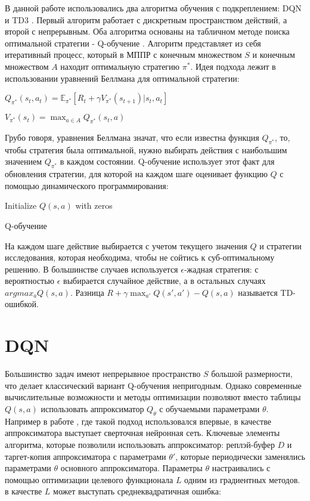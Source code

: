 \documentclass{mipt-thesis-bs}
\begin{document}
В данной работе использовались два алгоритма обучения с подкреплением: DQN \cite{DQN} и TD3 \cite{TD3}. Первый алгоритм работает с дискретным пространством действий, а второй с непрерывным. Оба алгоритма основаны на табличном методе поиска оптимальной стратегии - Q-обучение \cite{Q-обучение}. Алгоритм представляет из себя итеративный процесс, который в МППР с конечным множеством $S$ и конечным множеством $A$ находит оптимальную стратегию $\pi^*$. Идея подхода лежит в использовании уравнений Беллмана для оптимальной стратегии:
\begin{center}
$Q_{\pi^*}(s_t, a_t) = \mathbb{E}_{\pi^*}[R_{t} + \gamma V_{\pi^*}(s_{t+1})| s_t, a_t]$

$V_{\pi^*}(s_t) = \max_{a\in A}Q_{\pi^*}(s_t, a)$
\end{center}

Грубо говоря, уравнения Беллмана значат, что если известна функция $Q_{\pi^*}$, то, чтобы стратегия была оптимальной, нужно выбирать действия с наибольшим значением $Q_{\pi^*}$ в каждом состоянии. Q-обучение использует этот факт для обновления стратегии, для которой на каждом шаге оценивает функцию $Q$ с помощью динамического программирования: 

\begin{algorithm}[H]
\SetAlgoLined
Initialize $Q(s, a)$ with zeros\;
 \caption{Q-обучение}
\end{algorithm}

На каждом шаге действие выбирается с учетом текущего значения $Q$ и стратегии исследования, которая необходима, чтобы не сойтись к суб-оптимальному решению. В большинстве случаев используется $\epsilon$-жадная стратегия: с вероятностью $\epsilon$ выбирается случайное действие, а в остальных случаях $argmax_aQ(s,a)$. Разница $R+\gamma \max _{a'} Q(s', a')-Q(s, a)$ называется TD-ошибкой.

\chapter{DQN}

Большинство задач имеют непрерывное пространство $S$ большой размерности, что делает классический вариант Q-обучения непригодным. Однако современные вычислительные возможности и методы оптимизации позволяют вместо таблицы $Q(s,a)$ использовать аппроксиматор $Q_\theta$ с обучаемыми параметрами $\theta$. Например в работе \cite{DQN}, где такой подход использовался впервые, в качестве аппроксиматора выступает сверточная нейронная сеть. Ключевые элементы алгоритма, которые позволили использовать аппроксиматор: реплэй-буфер $D$ и таргет-копия аппроксиматора с параметрами $\theta'$, которые периодически заменялись параметрами $\theta$ основного аппроксиматора. Параметры $\theta$ настраивались с помощью оптимизации  целевого функционала $L$ одним из градиентных методов. в качестве $L$ может выступать среднеквадратичная ошибка:
\end{document}
